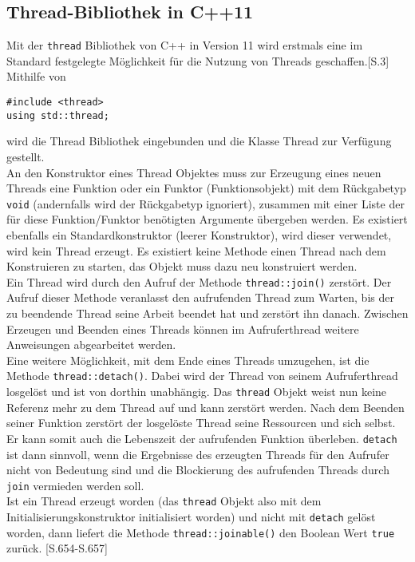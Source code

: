 \subsection{Thread-Bibliothek in C++11}
Mit der \texttt{thread} Bibliothek von C++ in Version 11 wird erstmals eine im Standard festgelegte Möglichkeit für die Nutzung von Threads geschaffen.\cite{Mutz_C++11}[S.3]\\
Mithilfe von
\begin{lstlisting}
#include <thread>
using std::thread;
\end{lstlisting}
wird die Thread Bibliothek eingebunden und die Klasse Thread zur Verfügung gestellt.\\
An den Konstruktor eines Thread Objektes muss zur Erzeugung eines neuen Threads eine Funktion oder ein Funktor (Funktionsobjekt) mit dem Rückgabetyp \texttt{void} (andernfalls wird der Rückgabetyp ignoriert), zusammen mit einer Liste der für diese Funktion/Funktor benötigten Argumente übergeben werden. Es existiert ebenfalls ein Standardkonstruktor (leerer Konstruktor), wird dieser verwendet, wird kein Thread erzeugt. Es existiert keine Methode einen Thread nach dem Konstruieren zu starten, das Objekt muss dazu neu konstruiert werden. \cite{c++_thread}\\
Ein Thread wird durch den Aufruf der Methode \texttt{thread::join()} zerstört. Der Aufruf dieser Methode veranlasst den aufrufenden Thread zum Warten, bis der zu beendende Thread seine Arbeit beendet hat und zerstört ihn danach. Zwischen Erzeugen und Beenden eines Threads können im Aufruferthread weitere Anweisungen abgearbeitet werden.\\
Eine weitere Möglichkeit, mit dem Ende eines Threads umzugehen, ist die Methode \texttt{thread::detach()}. Dabei wird der Thread von seinem Aufruferthread losgelöst und ist von dorthin unabhängig. Das \texttt{thread} Objekt weist nun keine Referenz mehr zu dem Thread auf und kann zerstört werden. Nach dem Beenden seiner Funktion zerstört der losgelöste Thread seine Ressourcen und sich selbst. Er kann somit auch die Lebenszeit der aufrufenden Funktion überleben. \texttt{detach} ist dann sinnvoll, wenn die Ergebnisse des erzeugten Threads für den Aufrufer nicht von Bedeutung sind und die Blockierung des aufrufenden Threads durch \texttt{join} vermieden werden soll.\\
Ist ein Thread erzeugt worden (das \texttt{thread} Objekt also mit dem Initialisierungskonstruktor initialisiert worden) und nicht mit \texttt{detach} gelöst worden, dann liefert die Methode \texttt{thread::joinable()} den Boolean Wert \texttt{true} zurück. \cite{Bar_Schodinger}[S.654-S.657]\\
